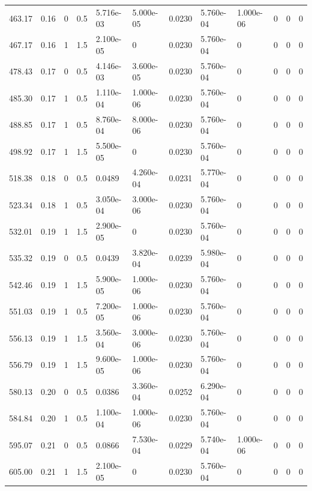 \documentclass[preview]{standalone}
\begin{document}
{{{{\begin{tabular}{L{1.2cm}C{1.2cm} C{0.3cm}C{0.5cm} C{1.4cm}C{1.4cm} C{1.4cm}C{1.4cm} C{1.6cm}C{1.6cm} C{1.6cm}C{1.6cm}}
  463.17  &  0.16  & 0     & 0.5 &  5.716e-03  & 5.000e-05  &  0.0230&   5.760e-04& 1.000e-06 & 0   &  0 & 0  \\ 
  467.17  &  0.16  & 1     & 1.5 &  2.100e-05  & 0  &  0.0230&   5.760e-04& 0 & 0   &  0 & 0  \\ 
  478.43  &  0.17  & 0     & 0.5 &  4.146e-03  & 3.600e-05  &  0.0230&   5.760e-04& 0 & 0   &  0 & 0  \\ 
  485.30  &  0.17  & 1     & 0.5 &  1.110e-04  & 1.000e-06  &  0.0230&   5.760e-04& 0 & 0   &  0 & 0  \\ 
  488.85  &  0.17  & 1     & 0.5 &  8.760e-04  & 8.000e-06  &  0.0230&   5.760e-04& 0 & 0   &  0 & 0  \\ 
  498.92  &  0.17  & 1     & 1.5 &  5.500e-05  & 0  &  0.0230&   5.760e-04& 0 & 0   &  0 & 0  \\ 
  518.38  &  0.18  & 0     & 0.5 &  0.0489  & 4.260e-04  &  0.0231&   5.770e-04& 0 & 0   &  0 & 0  \\ 
  523.34  &  0.18  & 1     & 0.5 &  3.050e-04  & 3.000e-06  &  0.0230&   5.760e-04& 0 & 0   &  0 & 0  \\ 
  532.01  &  0.19  & 1     & 1.5 &  2.900e-05  & 0  &  0.0230&   5.760e-04& 0 & 0   &  0 & 0  \\ 
  535.32  &  0.19  & 0     & 0.5 &  0.0439  & 3.820e-04  &  0.0239&   5.980e-04& 0 & 0   &  0 & 0  \\ 
  542.46  &  0.19  & 1     & 1.5 &  5.900e-05  & 1.000e-06  &  0.0230&   5.760e-04& 0 & 0   &  0 & 0  \\ 
  551.03  &  0.19  & 1     & 0.5 &  7.200e-05  & 1.000e-06  &  0.0230&   5.760e-04& 0 & 0   &  0 & 0  \\ 
  556.13  &  0.19  & 1     & 1.5 &  3.560e-04  & 3.000e-06  &  0.0230&   5.760e-04& 0 & 0   &  0 & 0  \\ 
  556.79  &  0.19  & 1     & 1.5 &  9.600e-05  & 1.000e-06  &  0.0230&   5.760e-04& 0 & 0   &  0 & 0  \\ 
  580.13  &  0.20  & 0     & 0.5 &  0.0386  & 3.360e-04  &  0.0252&   6.290e-04& 0 & 0   &  0 & 0  \\ 
  584.84  &  0.20  & 1     & 0.5 &  1.100e-04  & 1.000e-06  &  0.0230&   5.760e-04& 0 & 0   &  0 & 0  \\ 
  595.07  &  0.21  & 0     & 0.5 &  0.0866  & 7.530e-04  &  0.0229&   5.740e-04& 1.000e-06 & 0   &  0 & 0  \\ 
  605.00  &  0.21  & 1     & 1.5 &  2.100e-05  & 0  &  0.0230&   5.760e-04& 0 & 0   &  0 & 0  \\ 

\end{tabular}}}}}
\end{document}
